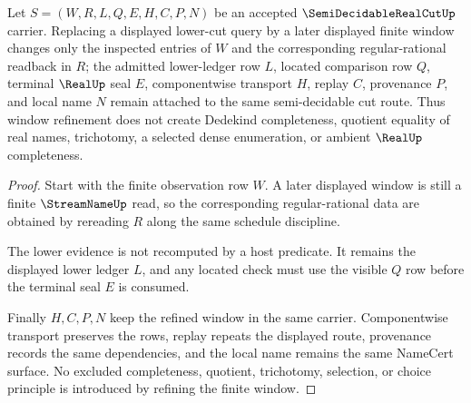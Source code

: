 \begin{theorem}
\label{thm:semi-decidable-real-cut-window-stability}
Let $S=(W,R,L,Q,E,H,C,P,N)$ be an accepted $\SemiDecidableRealCutUp$ carrier. Replacing a displayed lower-cut query by a later displayed finite window changes only the inspected entries of $W$ and the corresponding regular-rational readback in $R$; the admitted lower-ledger row $L$, located comparison row $Q$, terminal $\RealUp$ seal $E$, componentwise transport $H$, replay $C$, provenance $P$, and local name $N$ remain attached to the same semi-decidable cut route. Thus window refinement does not create Dedekind completeness, quotient equality of real names, trichotomy, a selected dense enumeration, or ambient $\RealUp$ completeness.
\end{theorem}
\begin{proof}
Start with the finite observation row $W$. A later displayed window is still a finite $\StreamNameUp$ read, so the corresponding regular-rational data are obtained by rereading $R$ along the same schedule discipline.

The lower evidence is not recomputed by a host predicate. It remains the displayed lower ledger $L$, and any located check must use the visible $Q$ row before the terminal seal $E$ is consumed.

Finally $H,C,P,N$ keep the refined window in the same carrier. Componentwise transport preserves the rows, replay repeats the displayed route, provenance records the same dependencies, and the local name remains the same NameCert surface. No excluded completeness, quotient, trichotomy, selection, or choice principle is introduced by refining the finite window.
\end{proof}




